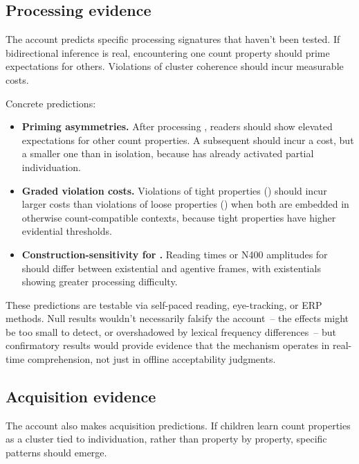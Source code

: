 \documentclass[12pt,a4paper]{article}
\begin{document}
\subsection{Processing evidence}

The account predicts specific processing signatures that haven't been tested. If bidirectional inference is real, encountering one count property should prime expectations for others. Violations of cluster coherence should incur measurable costs.

Concrete predictions:

\begin{itemize}
\item \textbf{Priming asymmetries.} After processing , readers should show elevated expectations for other count properties. A subsequent  should incur a cost, but a smaller one than  in isolation, because  has already activated partial individuation.
\item \textbf{Graded violation costs.} Violations of tight properties () should incur larger costs than violations of loose properties () when both are embedded in otherwise count-compatible contexts, because tight properties have higher evidential thresholds.
\item \textbf{Construction-sensitivity for .} Reading times or N400 amplitudes for  should differ between existential and agentive frames, with existentials showing greater processing difficulty.
\end{itemize}

These predictions are testable via self-paced reading, eye-tracking, or ERP methods. Null results wouldn't necessarily falsify the account~-- the effects might be too small to detect, or overshadowed by lexical frequency differences~-- but confirmatory results would provide evidence that the mechanism operates in real-time comprehension, not just in offline acceptability judgments.

\subsection{Acquisition evidence}

The account also makes acquisition predictions. If children learn count properties as a cluster tied to individuation, rather than property by property, specific patterns should emerge.
\end{document}
